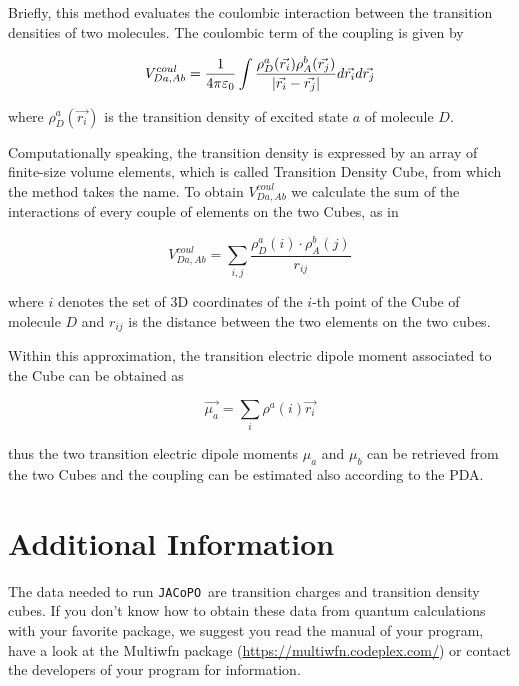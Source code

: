 \documentclass[a4paper]{article}
\newcommand{\jacopo}{\texttt{JACoPO}}
\DeclarePairedDelimiter\norm{\lvert}{\rvert}
\begin{document}
Briefly, this method evaluates the coulombic interaction between the transition densities of two molecules. The coulombic term of the coupling is given by

\begin{equation}
 V^{coul}_{Da,Ab} = \frac{1}{4\pi\varepsilon_0} \int \frac{\rho_D^a(\vec{r_i})\rho_A^b(\vec{r_j})}{\norm{\vec{r_i} - \vec{r_j}}} d\vec{r_i} d\vec{r_j}
 \label{eq:TDC}
\end{equation}

where $\rho_D^a(\vec{r_i})$ is the transition density of excited state $a$ of molecule $D$.

Computationally speaking, the transition density is expressed by an array of finite-size volume elements, which is called Transition Density Cube, from which the method takes the name. To obtain $V^{coul}_{Da,Ab}$ we calculate the sum of the interactions of every couple of elements on the two Cubes, as in

\begin{equation}
 V^{coul}_{Da,Ab} = \sum_{i,j} \frac{\rho_D^a(i)\cdot \rho_A^b(j)}{r_{ij}}
 \label{eq:TDC1}
\end{equation}

where $i$ denotes the set of 3D coordinates of the $i$-th point of the Cube of molecule $D$ and $r_{ij}$ is the distance between the two elements on the two cubes.

Within this approximation, the transition electric dipole moment associated to the Cube can be obtained as

\begin{equation}
 \vec{\mu_a} = \sum_i \rho^a(i) \vec{r_i}
 \label{eq:mu_TDC}
\end{equation}

thus the two transition electric dipole moments $\mu_a$ and $\mu_b$ can be retrieved from the two Cubes and the coupling can be estimated also according to the PDA.

\section{Additional Information}
The data needed to run \jacopo\ are transition charges and transition density cubes. If you don't know how to obtain these data from quantum calculations with your favorite package, we suggest you read the manual of your program, have a look at the Multiwfn package (\url{https://multiwfn.codeplex.com/}) or contact the developers of your program for information.
\end{document}
